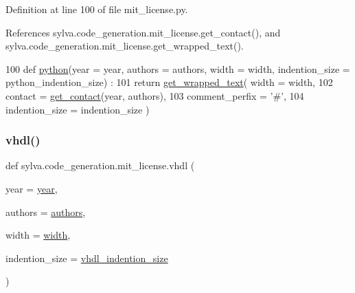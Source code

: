 Definition at line 100 of file mit\+\_\+license.\+py.



References sylva.\+code\+\_\+generation.\+mit\+\_\+license.\+get\+\_\+contact(), and sylva.\+code\+\_\+generation.\+mit\+\_\+license.\+get\+\_\+wrapped\+\_\+text().


\begin{DoxyCode}
100 \textcolor{keyword}{def }\hyperlink{namespacesylva_1_1code__generation_1_1mit__license_a544584e18569581883f2982154c52965}{python}(year = year, authors = authors, width = width, indention\_size = python\_indention\_size) :
101   \textcolor{keywordflow}{return} \hyperlink{namespacesylva_1_1code__generation_1_1mit__license_a85d377334cea2a76d3664a6a8981638f}{get\_wrapped\_text}( width = width,
102                            contact = \hyperlink{namespacesylva_1_1code__generation_1_1mit__license_a7cf6054f669c578c4c64370849e8edc2}{get\_contact}(year, authors),
103                            comment\_perfix = \textcolor{stringliteral}{'#'},
104                            indention\_size = indention\_size )
\end{DoxyCode}
\mbox{\label{namespacesylva_1_1code__generation_1_1mit__license_a5c8d9ae3b2d4db392cdc66e37b035675}} 
\subsubsection{\texorpdfstring{vhdl()}{vhdl()}}
{\footnotesize\ttfamily def sylva.\+code\+\_\+generation.\+mit\+\_\+license.\+vhdl (\begin{DoxyParamCaption}\item[{}]{year = {\ttfamily \hyperlink{namespacesylva_1_1code__generation_1_1mit__license_a4902e976e16e0ac4d890af277506dc41}{year}},  }\item[{}]{authors = {\ttfamily \hyperlink{namespacesylva_1_1code__generation_1_1mit__license_ab235b5262a6f93e7dcdef3c73e16621a}{authors}},  }\item[{}]{width = {\ttfamily \hyperlink{namespacesylva_1_1code__generation_1_1mit__license_aec2b80ac82983fcc3ba9bae02fb001d1}{width}},  }\item[{}]{indention\+\_\+size = {\ttfamily \hyperlink{namespacesylva_1_1code__generation_1_1mit__license_a74f6e9d6351c0499cc490f9457d4baf2}{vhdl\+\_\+indention\+\_\+size}} }\end{DoxyParamCaption})}



